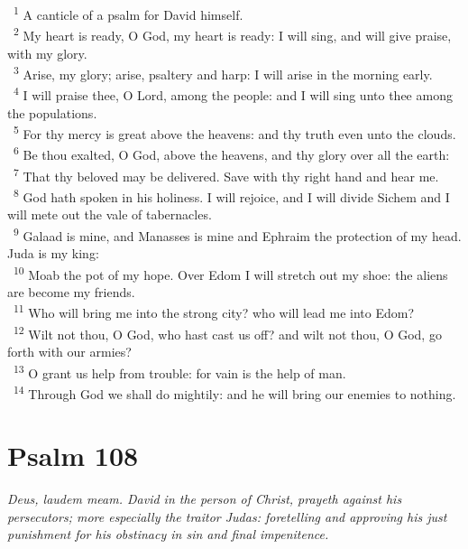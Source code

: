 \documentclass[a5paper,12pt]{article}
\begin{document}
\begin{multicols*}{2}
~\textsuperscript{1} A canticle of a psalm for David himself.\\
~\textsuperscript{2} My heart is ready, O God, my heart is ready: I will sing, and will give praise, with my glory.\\
~\textsuperscript{3} Arise, my glory; arise, psaltery and harp: I will arise in the morning early.\\
~\textsuperscript{4} I will praise thee, O Lord, among the people: and I will sing unto thee among the populations.\\
~\textsuperscript{5} For thy mercy is great above the heavens: and thy truth even unto the clouds.\\
~\textsuperscript{6} Be thou exalted, O God, above the heavens, and thy glory over all the earth:\\
~\textsuperscript{7} That thy beloved may be delivered. Save with thy right hand and hear me.\\
~\textsuperscript{8} God hath spoken in his holiness. I will rejoice, and I will divide Sichem and I will mete out the vale of tabernacles.\\
~\textsuperscript{9} Galaad is mine, and Manasses is mine and Ephraim the protection of my head. Juda is my king:\\
~\textsuperscript{10} Moab the pot of my hope. Over Edom I will stretch out my shoe: the aliens are become my friends.\\
~\textsuperscript{11} Who will bring me into the strong city? who will lead me into Edom?\\
~\textsuperscript{12} Wilt not thou, O God, who hast cast us off? and wilt not thou, O God, go forth with our armies?\\
~\textsuperscript{13} O grant us help from trouble: for vain is the help of man.\\
~\textsuperscript{14} Through God we shall do mightily: and he will bring our enemies to nothing.\\

\section{Psalm 108}
\label{sec:org4347072}
\emph{Deus, laudem meam. David in the person of Christ, prayeth against his persecutors; more especially the traitor Judas: foretelling and approving his just punishment for his obstinacy in sin and final impenitence.}\\


\end{multicols*}
\end{document}
